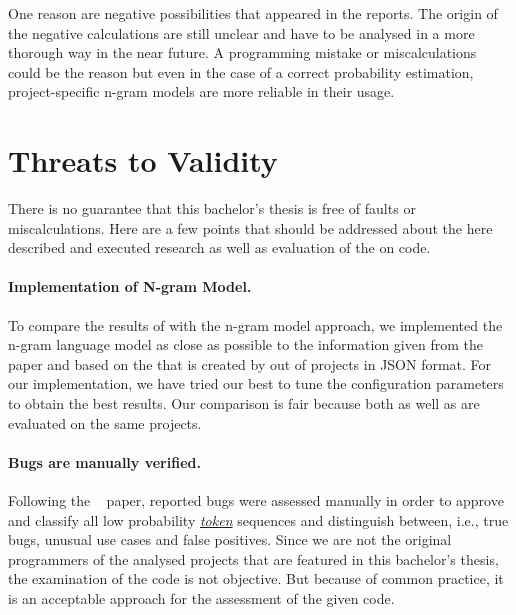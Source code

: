 One reason are negative possibilities that appeared in the reports. The origin of the negative calculations are still unclear and have to be analysed in a more thorough way in the near future. A programming mistake or miscalculations could be the reason but even in the case of a correct probability estimation, project-specific n-gram models are more reliable in their usage.  


\section{Threats to Validity}\label{sec:threats-to-validity}
There is no guarantee that this bachelor's thesis is free of faults or miscalculations. Here are a few points that should be addressed about the here described and executed research as well as evaluation of the \ngram{} on \scratch{} code.

\paragraph{Implementation of N-gram Model.}
To compare the results of \litterbox{} with the n-gram model approach, we implemented the n-gram language model as close as possible to the information given from the \bugram{}~\cite{bugram} paper and based on the \AST{} that is created by \litterbox{} out of \scratch{} projects in JSON format. For our implementation, we have tried our best to tune the configuration parameters to obtain the best results. Our comparison is fair because both \litterbox{} as well as \ngram{} are evaluated on the same projects.

\paragraph{Bugs are manually verified.}
Following the \bugram{}~\cite{bugram} paper, reported bugs were assessed manually in order to approve and classify all low probability \hyperref[def:token]{\textit{token}} sequences and distinguish between, i.e., true bugs, unusual use cases and false positives. Since we are not the original programmers of the analysed projects that are featured in this bachelor's thesis, the examination of the code is not objective. But because of common practice, it is an acceptable approach for the assessment of the given code.